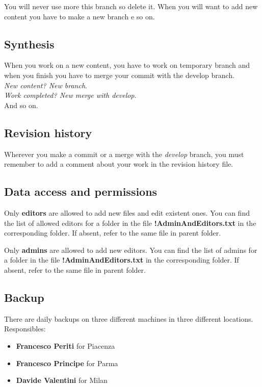 \documentclass[12pt]{article}
\begin{document}
You will never use more this branch so delete it. When you will want to add new content you have to make a new branch e so on. 

\subsection*{Synthesis}
When you work on a new content, you have to work on temporary branch and when you finish you have to merge your commit with the develop branch.\\
\textit{New content? New branch}.\\
\textit{Work completed? New merge with develop}.\\
And so on.

\subsection*{Revision history}
Wherever you make a commit or a merge with the \textit{develop} branch, you must remember to add a comment about your work in the revision history file. %

\subsection{Data access and permissions}
Only \textbf{editors} are allowed to add new files and edit existent ones. You can find the list of allowed editors for a folder in the file \textbf{!AdminAndEditors.txt} in the corresponding folder. If absent, refer to the same file in parent folder.

Only \textbf{admins} are allowed to add new editors. You can find the list of admins for a folder in the file \textbf{!AdminAndEditors.txt} in the corresponding folder. If absent, refer to the same file in parent folder.

\subsection{Backup}
There are daily backups on three different machines in three different locations.
Responsibles:
\begin{itemize}
	\item \textbf{Francesco Periti} for Piacenza
	\item \textbf{Francesco Principe} for Parma
	\item \textbf{Davide Valentini} for Milan
\end{itemize}
\end{document}
